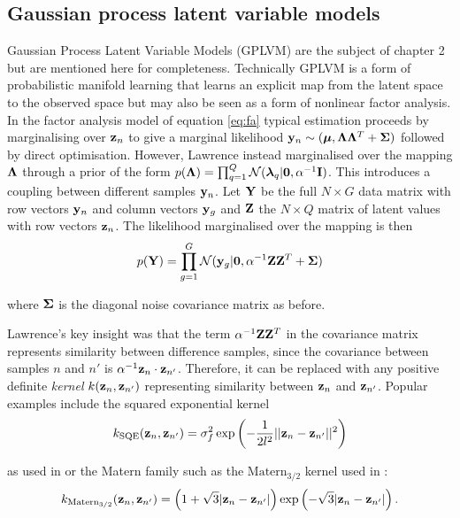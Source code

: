 \subsection{Gaussian process latent variable models} \label{sec:gplvm}

Gaussian Process Latent Variable Models (GPLVM) are the subject of chapter 2 but are mentioned here for completeness. Technically GPLVM is a form of probabilistic manifold learning that learns an explicit map from the latent space to the observed space but may also be seen as a form of nonlinear factor analysis. In the factor analysis model of equation \ref{eq:fa} typical estimation proceeds by marginalising over $\mathbf{z}_n$ to give a marginal likelihood $\mathbf{y}_n \sim(\bm{\mu}, \bm{\Lambda} \bm{\Lambda}^T + \bm{\Sigma})$ followed by direct optimisation. However, Lawrence \cite{lawrence2004gaussian} instead marginalised over the mapping $\bm{\Lambda}$ through a prior of the form $p(\bm{\Lambda}) = \prod_{q=1}^Q \mathcal{N}(\bm{\lambda}_q | \bm{0}, \alpha^{-1} \mathbf{I})$. This introduces a coupling between different samples $\mathbf{y}_n$. Let $\mathbf{Y}$ be the full $N \times G$ data matrix with row vectors $\mathbf{y}_n$ and column vectors $\mathbf{y}_g$ and $\mathbf{Z}$ the $N \times Q$
matrix of latent values with row vectors $\mathbf{z}_n$. The likelihood marginalised over the mapping is then
\begin{equation}
  p(\mathbf{Y}) = \prod_{g = 1}^G \mathcal{N}(\mathbf{y}_g | \bm{0}, \alpha^{-1} \mathbf{Z} \mathbf{Z}^T + \bm{\Sigma})
\end{equation}

where $\bm{\Sigma}$ is the diagonal noise covariance matrix as before.

Lawrence's key insight was that the term $\alpha^{-1} \mathbf{Z} \mathbf{Z}^T$ in the covariance matrix represents similarity between difference samples, since the covariance between samples $n$ and $n'$ is $\alpha^{-1} \mathbf{z}_n \cdot \mathbf{z}_{n'}$. Therefore, it can be replaced with any positive definite \emph{kernel} $k(\mathbf{z}_n, \mathbf{z}_{n'})$ representing similarity between $\mathbf{z}_n$ and $\mathbf{z}_{n'}$. Popular examples include the squared exponential kernel
\begin{equation}
k_{\text{SQE}}(\mathbf{z}_n, \mathbf{z}_{n'}) = \sigma_f^2 \exp\left(-\frac{1}{2l^2} \lvert \lvert \mathbf{z}_n - \mathbf{z}_{n'} \rvert\rvert^2\right)
\end{equation}

as used in \cite{campbell2016order} or the Matern family such as the $\text{Matern}_{3/2}$ kernel used in \cite{Reid2016-yo}:
\begin{equation}
  k_{\text{Matern}_{3/2}}(\mathbf{z}_n, \mathbf{z}_{n'}) =
  \left(
  1 + \sqrt{3} \lvert \mathbf{z}_n - \mathbf{z}_{n'} \rvert \right) \exp\left( - \sqrt{3} \lvert \mathbf{z}_n - \mathbf{z}_{n'} \rvert \right).
\end{equation}

